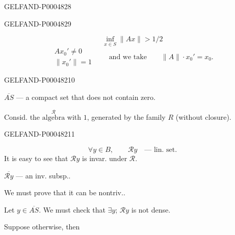 \begin{GelfandAdjacentEvidence}{GELFAND-P000482}{8}

\end{GelfandAdjacentEvidence}
\begin{GelfandAdjacentEvidence}{GELFAND-P000482}{9}

\[
\inf_{x\in S}\lVert Ax\rVert>1/2
\]
\[
\begin{gathered}
Ax_0'\ne0\\
\lVert x_0'\rVert=1
\end{gathered}
\qquad\text{and we take}\qquad
\lVert A\rVert\cdot x_0'=x_0.
\]
\end{GelfandAdjacentEvidence}
\begin{GelfandAdjacentEvidence}{GELFAND-P000482}{10}


$\overline{AS}$ — a compact set that does not contain zero.

Consid. the $\overset{\mathcal R}{\text{algebra}}$ with $1$,
generated by the family $R$ (without closure).
\end{GelfandAdjacentEvidence}
\begin{GelfandAdjacentEvidence}{GELFAND-P000482}{11}

\[
\forall y\in B,\qquad \mathcal R y\quad\text{— lin. set}.
\]
It is easy to see that $\mathcal R y$ is invar. under $\mathcal R$.

$\overline{\mathcal R y}$ — an inv. subsp..

We must prove that it can be nontriv..

Let $y\in\overline{AS}$. We must check that $\exists y$;
$\mathcal R y$ is not dense.

Suppose otherwise, then
\end{GelfandAdjacentEvidence}
